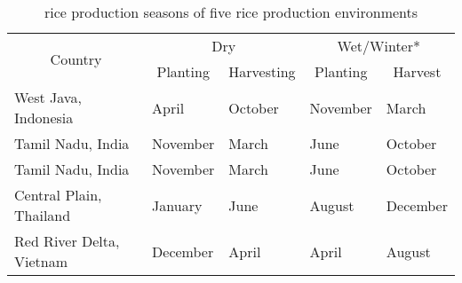 \begin{table}
\centering
\caption{rice production seasons of five rice production environments}
\label{table:riceproduction_season}
\begin{tabular}{lllll}
\hline
\multicolumn{1}{c}{\multirow{2}{*}{Country}} & \multicolumn{2}{c}{Dry}                                       & \multicolumn{2}{c}{Wet/Winter*}                            \\
\cline{2-5}
\multicolumn{1}{c}{}                         & \multicolumn{1}{c}{Planting} & \multicolumn{1}{c}{Harvesting} & \multicolumn{1}{c}{Planting} & \multicolumn{1}{c}{Harvest} \\
\hline
West Java, Indonesia                                    & April                        & October                        & November                     & March                       \\
Tamil Nadu, India                                        & November                     & March                            & June                          & October                     \\
Tamil Nadu, India                                        & November                     & March                            & June                          & October                     \\
Central Plain, Thailand                                     & January                      & June                           & August                       & December                    \\
Red River Delta, Vietnam                                      & December                     & April                          & April                        & August      \\
\hline               
\end{tabular}
\end{table}